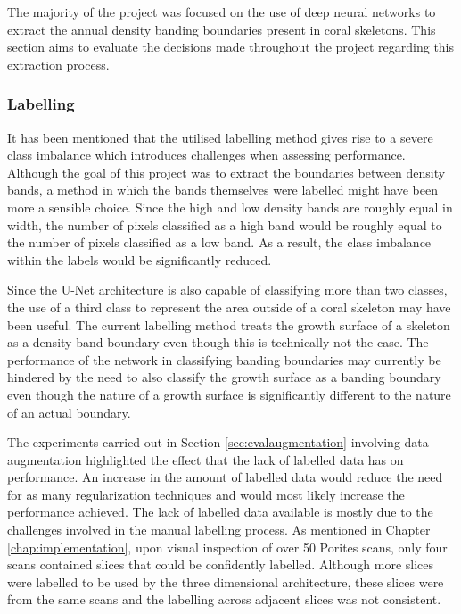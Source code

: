 The majority of the project was focused on the use of deep neural networks to extract the annual density banding boundaries present in coral skeletons. This section aims to evaluate the decisions made throughout the project regarding this extraction process.

\subsubsection{Labelling}

It has been mentioned that the utilised labelling method gives rise to a severe class imbalance which introduces challenges when assessing performance. Although the goal of this project was to extract the boundaries between density bands, a method in which the bands themselves were labelled might have been more a sensible choice. Since the high and low density bands are roughly equal in width, the number of pixels classified as a high band would be roughly equal to the number of pixels classified as a low band. As a result, the class imbalance within the labels would be significantly reduced.

Since the U-Net architecture is also capable of classifying more than two classes, the use of a third class to represent the area outside of a coral skeleton may have been useful. The current labelling method treats the growth surface of a skeleton as a density band boundary even though this is technically not the case. The performance of the network in classifying banding boundaries may currently be hindered by the need to also classify the growth surface as a banding boundary even though the nature of a growth surface is significantly different to the nature of an actual boundary.

The experiments carried out in Section \ref{sec:evalaugmentation} involving data augmentation highlighted the effect that the lack of labelled data has on performance. An increase in the amount of labelled data would reduce the need for as many regularization techniques and would most likely increase the performance achieved. The lack of labelled data available is mostly due to the challenges involved in the manual labelling process. As mentioned in Chapter \ref{chap:implementation}, upon visual inspection of over 50 Porites scans, only four scans contained slices that could be confidently labelled. Although more slices were labelled to be used by the three dimensional architecture, these slices were from the same scans and the labelling across adjacent slices was not consistent.

